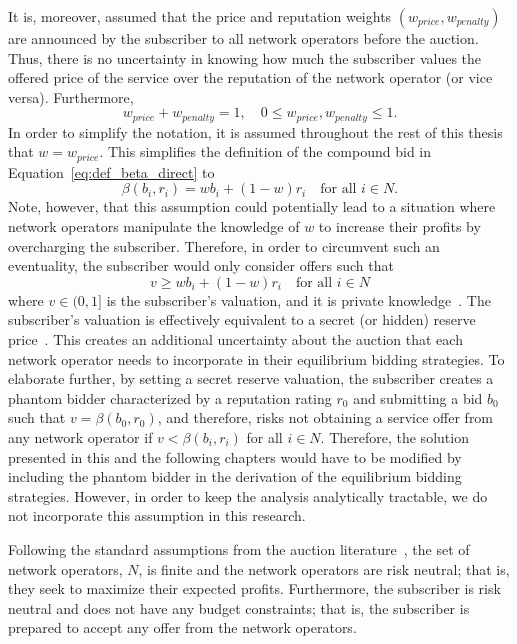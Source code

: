 It is, moreover, assumed that the price and reputation weights $(w_{price}, w_{penalty})$ are announced by the subscriber to all network operators before the auction. Thus, there is no uncertainty in knowing how much the subscriber values the offered price of the service over the reputation of the network operator (or vice versa). Furthermore,
\begin{equation*}
	w_{price} + w_{penalty} = 1,\quad 0\le w_{price},w_{penalty} \le 1.
\end{equation*}
In order to simplify the notation, it is assumed throughout the rest of this thesis that $w=w_{price}$. This simplifies the definition of the compound bid in Equation~\eqref{eq:def_beta_direct} to
\begin{equation*}
  \beta(b_i, r_i) = wb_i + (1-w)r_i\quad\text{for all } i\in N.
\end{equation*}
Note, however, that this assumption could potentially lead to a situation where network operators manipulate the knowledge of $w$ to increase their profits by overcharging the subscriber. Therefore, in order to circumvent such an eventuality, the subscriber would only consider offers such that
\begin{equation}
	\label{eq:subscribers_valuation_direct}
	v\geq wb_i + (1-w)r_i \quad\text{for all } i\in N
\end{equation}
where $v\in (0,1]$ is the subscriber's valuation, and it is private knowledge~\cite{DMLeBodic00}. The subscriber's valuation is effectively equivalent to a secret (or hidden) reserve price~\cite{Vincent1995575,LiPerrigne1999,BajariHortacsu2003}. This creates an additional uncertainty about the auction that each network operator needs to incorporate in their equilibrium bidding strategies. To elaborate further, by setting a secret reserve valuation, the subscriber creates a phantom bidder characterized by a reputation rating $r_0$ and submitting a bid $b_0$ such that $v=\beta(b_0,r_0)$, and therefore, risks not obtaining a service offer from any network operator if $v < \beta(b_i,r_i)$ for all $i\in N$. Therefore, the solution presented in this and the following chapters would have to be modified by including the phantom bidder in the derivation of the equilibrium bidding strategies. However, in order to keep the analysis analytically tractable, we do not incorporate this assumption in this research.
	
Following the standard assumptions from the auction literature~\cite{Krishna10}, the set of network operators, $N$, is finite and the network operators are risk neutral; that is, they seek to maximize their expected profits. Furthermore, the subscriber is risk neutral and does not have any budget constraints; that is, the subscriber is prepared to accept any offer from the network operators.

